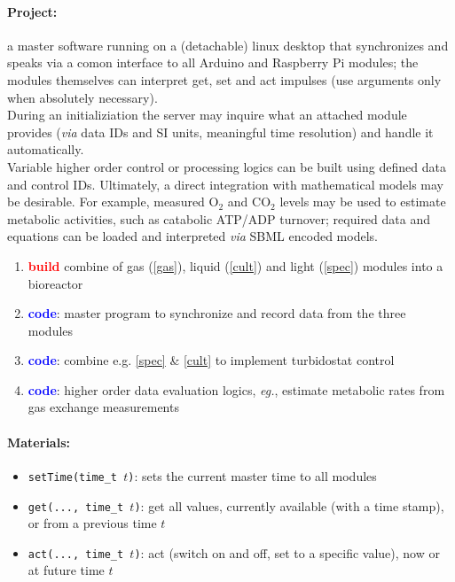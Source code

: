 \documentclass[12pt,a4paper]{scrartcl}
\newcommand{\build}[0]{\textcolor{red}{\textbf{build}}}
\newcommand{\code}[0]{\textcolor{blue}{\textbf{code}}}
\newcommand{\ox}[0]{O$_2$}
\newcommand{\cox}[0]{CO$_2$}
\begin{document}
\paragraph{Project:} a master software running on a (detachable) linux 
desktop that synchronizes and speaks via a comon interface to all
Arduino and Raspberry Pi modules; the modules themselves can interpret
get, set and act impulses (use arguments only when absolutely
necessary).\\ During an initializiation the server may inquire what an
attached module provides (\textit{via} data IDs and SI units,
meaningful time resolution) and handle it automatically. \\ Variable
higher order control or processing logics can be built using defined
data and control IDs. Ultimately, a direct integration with
mathematical models may be desirable.  For example, measured \ox{} and
\cox{} levels may be used to estimate metabolic activities, such as
catabolic ATP/ADP turnover; required data and equations can be loaded
and interpreted \textit{via} SBML encoded models.
\begin{enumerate}
\item \build{} combine of gas (\ref{gas}), liquid (\ref{cult})
  and light (\ref{spec}) modules into a bioreactor
\item \code{}: master program to synchronize and record data from
  the three modules
\item \code{}: combine e.g. \ref{spec} \& \ref{cult} to implement
  turbidostat control
\item \code{}: higher order data evaluation logics, \textit{eg.}, estimate
  metabolic rates from gas exchange measurements
\end{enumerate}


\paragraph{Materials:}
\begin{itemize}
\item \texttt{setTime(time\_t $t$)}: sets the current master time to
  all modules
\item \texttt{get(..., time\_t $t$)}: get all values, currently
  available (with a time stamp), or from a previous time $t$
\item \texttt{act(..., time\_t $t$)}: act (switch on and off, set to a
  specific value), now or at future time $t$
\end{itemize}
\end{document}
